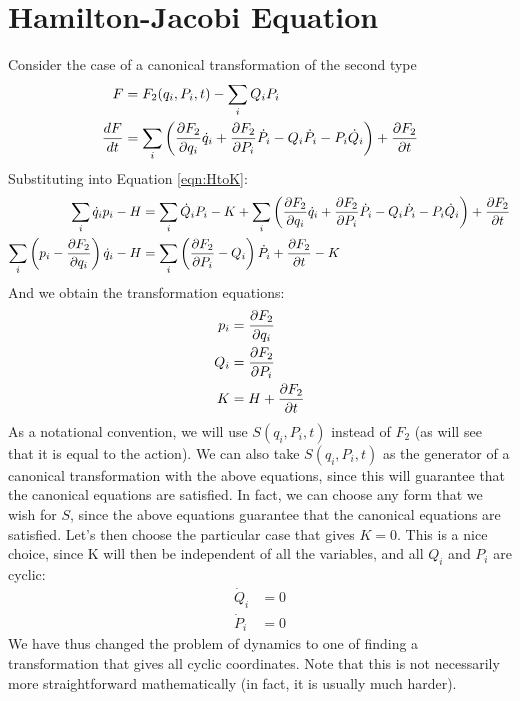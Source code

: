 \section{Hamilton-Jacobi Equation}
Consider the case of a canonical transformation of the second type
\begin{align}
F&=F_2(q_i,P_i,t)-\sum_iQ_iP_i\nonumber\\
\frac{dF}{dt}&=\sum_i\left(\frac{\partial F_2}{\partial q_i}\dot q_i+\frac{\partial F_2}{\partial P_i}\dot P_i- Q_i\dot P_i-P_i\dot Q_i\right)+\frac{\partial F_2}{\partial t}
\end{align}
Substituting into Equation \ref{eqn:HtoK}:
\begin{align}
\sum_i\dot q_ip_i-H&=\sum_i \dot Q_iP_i-K+\sum_i\left(\frac{\partial F_2}{\partial q_i}\dot q_i+\frac{\partial F_2}{\partial P_i}\dot P_i- Q_i\dot P_i-P_i\dot Q_i\right)+\frac{\partial F_2}{\partial t}\nonumber\\
\sum_i\left(p_i-\frac{\partial F_2}{\partial q_i}\right)\dot q_i -H&=\sum_i\left(\frac{\partial F_2}{\partial P_i}- Q_i \right)\dot P_i+\frac{\partial F_2}{\partial t} -K
\end{align}
And we obtain the transformation equations:
\begin{align}
p_i&=\frac{\partial F_2}{\partial q_i}\nonumber\\
Q_i&=\frac{\partial F_2}{\partial P_i}\nonumber\\
K&=H+\frac{\partial F_2}{\partial t}
\end{align}
As a notational convention, we will use $S(q_i,P_i,t)$ instead of $F_2$ (as will see that it is equal to the action). We can also take $S(q_i,P_i,t)$ as the generator of a canonical transformation with the above equations, since this will guarantee that the canonical equations are satisfied. In fact, we can choose any form that we wish for $S$, since the above equations guarantee that the canonical equations are satisfied. Let's then choose the particular case that gives $K=0$. This is a nice choice, since K will then be independent of all the variables, and all $Q_i$ and $P_i$ are cyclic:
\begin{align}
\dot Q_i&=0\nonumber\\
\dot P_i&=0
\end{align}
We have thus changed the problem of dynamics to one of finding a transformation that gives all cyclic coordinates. Note that this is not necessarily more straightforward mathematically (in fact, it is usually much harder).


